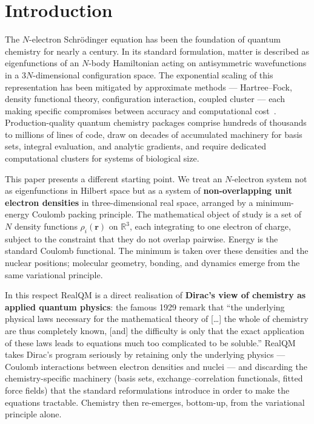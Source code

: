\documentclass[11pt]{article}
\begin{document}
\section{Introduction}

The $N$-electron Schr\"odinger equation has been the foundation of quantum chemistry for nearly a century. In its standard formulation, matter is described as eigenfunctions of an $N$-body Hamiltonian acting on antisymmetric wavefunctions in a $3N$-dimensional configuration space. The exponential scaling of this representation has been mitigated by approximate methods --- Hartree--Fock, density functional theory, configuration interaction, coupled cluster --- each making specific compromises between accuracy and computational cost~\cite{HK64,KS65,MHG17}. Production-quality quantum chemistry packages comprise hundreds of thousands to millions of lines of code, draw on decades of accumulated machinery for basis sets, integral evaluation, and analytic gradients, and require dedicated computational clusters for systems of biological size.

This paper presents a different starting point. We treat an $N$-electron system not as eigenfunctions in Hilbert space but as a system of \textbf{non-overlapping unit electron densities} in three-dimensional real space, arranged by a minimum-energy Coulomb packing principle. The mathematical object of study is a set of $N$ density functions $\rho_i(\mathbf{r})$ on $\mathbb{R}^3$, each integrating to one electron of charge, subject to the constraint that they do not overlap pairwise. Energy is the standard Coulomb functional. The minimum is taken over these densities and the nuclear positions; molecular geometry, bonding, and dynamics emerge from the same variational principle.

In this respect RealQM is a direct realisation of \textbf{Dirac's view of chemistry as applied quantum physics}: the famous 1929 remark that ``the underlying physical laws necessary for the mathematical theory of [\ldots] the whole of chemistry are thus completely known, [and] the difficulty is only that the exact application of these laws leads to equations much too complicated to be soluble.'' RealQM takes Dirac's program seriously by retaining only the underlying physics --- Coulomb interactions between electron densities and nuclei --- and discarding the chemistry-specific machinery (basis sets, exchange--correlation functionals, fitted force fields) that the standard reformulations introduce in order to make the equations tractable. Chemistry then re-emerges, bottom-up, from the variational principle alone.
\end{document}

